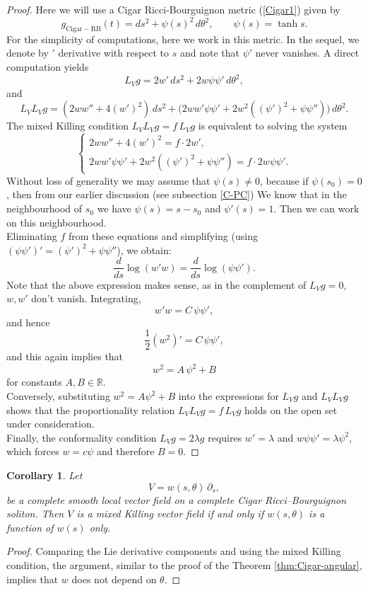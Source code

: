 \documentclass{article}
\newtheorem{corollary}{Corollary}[section]
\theoremstyle{definition}
\theoremstyle{remark}
\begin{document}
\begin{proof}
Here we will use a Cigar Ricci-Bourguignon metric (\ref{Cigar1})
given by
\begin{equation*}
g_{\mathrm{Cigar-RB}}(t) =  ds^2 + \psi(s)^2\,d\theta^2, \qquad \psi(s)=\tanh s.
\end{equation*}
For the simplicity of computations, here we work in this metric.  In the sequel, we denote by $'$  derivative with respect to $s$  and 
note that  $\psi'$ never vanishes.  
A direct computation yields
\[
L_V g = 2w'\,ds^2 + 2w\psi\psi'\,d\theta^2,
\]
and
\[
L_V L_V g = (2ww'' + 4(w')^2)\,ds^2 + \bigl(2ww'\psi\psi' + 2w^2((\psi')^2 + \psi\psi'')\bigr)\,d\theta^2.
\]
The mixed Killing condition $L_V L_V g = f\,L_V g$ is equivalent to solving the system
\[
\begin{cases}
2ww'' + 4(w')^2 = f \cdot 2w' ,\\
2ww'\psi\psi' + 2w^2((\psi')^2 + \psi\psi'') = f \cdot 2w\psi\psi'.
\end{cases}
\]
Without loss of generality we may assume that $\psi(s) \neq 0$, because  if 
$\psi(s_{0}) = 0$, then from our earlier discussion
(see subsection \ref{C-PC}) We know that  in the neighbourhood
of $s_{0}$ we have $\psi(s) = s - s_{0}$ and $\psi'(s) = 1$. Then we can work on this neighbourhood.\\
 Eliminating $f$ from these equations and simplifying (using  $(\psi\psi')' = (\psi')^2 + \psi\psi''$), we obtain:  
\[
\frac{d}{ds}\log(w'w) = \frac{d}{ds}\log(\psi\psi').
\]
Note that the above expression makes sense, as in the 
complement of $L_{V}g = 0$, $w, w'$ don't vanish.
Integrating,
\[
w'w = C\,\psi\psi',
\]
and hence
\[
\frac{1}{2}(w^2)' = C\,\psi\psi',
\]
 and this again implies that
\[
w^2 = A\,\psi^2 + B
\]
for constants $A,B\in\mathbb{R}$.\\
\noindent 
Conversely, substituting $w^2 = A\psi^2   + B$ into the expressions for $L_V g$ and $L_V L_V g$ shows that the proportionality relation $L_V L_V g = f\,L_V g$ holds on the open  set under consideration. \\ Finally, the conformality condition $L_V g = 2\lambda g$ requires $w' = \lambda$ and $w\psi\psi' = \lambda\psi^2$, which forces $w = c\psi$ and therefore $B = 0$.          
\end{proof}


\begin{corollary}
Let 
\[
V = w(s, \theta)\,\partial_s,
\]
be a complete smooth local vector field on a complete Cigar Ricci--Bourguignon soliton. 
Then $V$ is a mixed Killing vector field  
if and only if $w(s, \theta)$ is a function of  $w(s)$ only.
\end{corollary}
\begin{proof}
Comparing  the Lie derivative components and using the mixed Killing condition, the argument, similar to the proof of the Theorem \ref{thm:Cigar-angular}, implies that 
$w$ does not depend on $\theta$.
  \end{proof}
\end{document}
